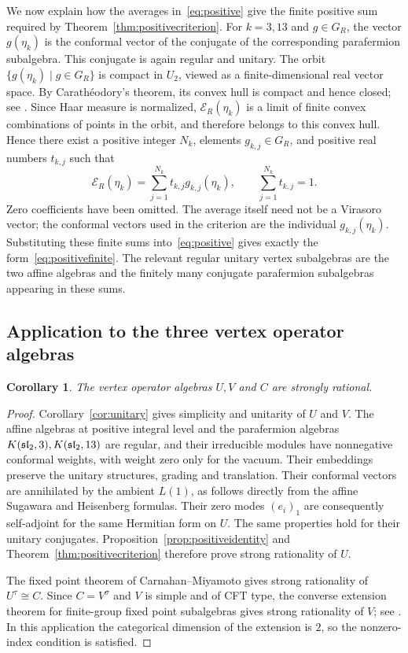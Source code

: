 \documentclass[11pt,reqno]{amsart}
\newtheorem{corollary}[theorem]{Corollary}
\theoremstyle{definition}\newtheorem{definition}[theorem]{Definition}
\theoremstyle{remark}\newtheorem{remark}[theorem]{Remark}
\numberwithin{equation}{section}
\begin{document}
\begingroup
We now explain how the averages in~\eqref{eq:positive} give the finite positive sum required by Theorem~\ref{thm:positivecriterion}. For $k=3,13$ and $g\in G_R$, the vector $g(\eta_k)$ is the conformal vector of the conjugate of the corresponding parafermion subalgebra. This conjugate is again regular and unitary. The orbit $\{g(\eta_k)\mid g\in G_R\}$ is compact in $U_2$, viewed as a finite-dimensional real vector space. By Carath\'eodory's theorem, its convex hull is compact and hence closed; see \cite[Propositions 1.2.1--1.2.2]{Bertsekas}. Since Haar measure is normalized, $\mathcal E_R(\eta_k)$ is a limit of finite convex combinations of points in the orbit, and therefore belongs to this convex hull. Hence there exist a positive integer $N_k$, elements $g_{k,j}\in G_R$, and positive real numbers $t_{k,j}$ such that
\[
 \mathcal E_R(\eta_k)
   =\sum_{j=1}^{N_k}t_{k,j}g_{k,j}(\eta_k),
 \qquad \sum_{j=1}^{N_k}t_{k,j}=1.
\]
Zero coefficients have been omitted. The average itself need not be a Virasoro vector; the conformal vectors used in the criterion are the individual $g_{k,j}(\eta_k)$. Substituting these finite sums into~\eqref{eq:positive} gives exactly the form~\eqref{eq:positivefinite}. The relevant regular unitary vertex subalgebras are the two affine algebras and the finitely many conjugate parafermion subalgebras appearing in these sums.
\par\endgroup

\subsection{Application to the three vertex operator algebras}

\begin{corollary}\label{cor:rationality}
The vertex operator algebras $U,V$ and $C$ are strongly rational.
\end{corollary}
\begin{proof}
Corollary~\ref{cor:unitary} gives simplicity and unitarity of $U$ and $V$. The affine algebras at positive integral level and the parafermion algebras $K(\mathfrak{sl}_2,3),K(\mathfrak{sl}_2,13)$ are regular, and their irreducible modules have nonnegative conformal weights, with weight zero only for the vacuum. Their embeddings preserve the unitary structures, grading and translation. Their conformal vectors are annihilated by the ambient $L(1)$, as follows directly from the affine Sugawara and Heisenberg formulas. Their zero modes $(e_i)_1$ are consequently self-adjoint for the same Hermitian form on $U$. The same properties hold for their unitary conjugates. Proposition~\ref{prop:positiveidentity} and Theorem~\ref{thm:positivecriterion} therefore prove strong rationality of $U$.

The fixed point theorem of Carnahan--Miyamoto \cite{CM} gives strong rationality of $U^\tau\cong C$. Since $C=V^\sigma$ and $V$ is simple and of CFT type, the converse extension theorem for finite-group fixed point subalgebras gives strong rationality of $V$; see \cite[Example 4.2]{McRaeExt}. In this application the categorical dimension of the extension is $2$, so the nonzero-index condition is satisfied.
\end{proof}
\end{document}
